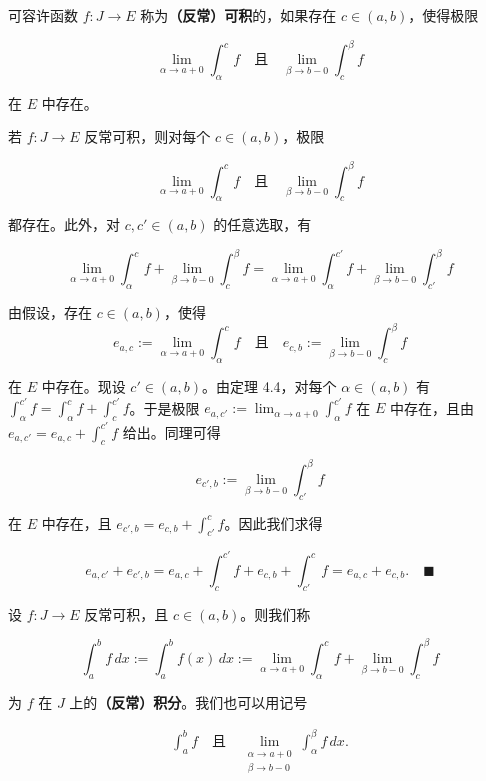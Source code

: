 可容许函数 $ f : J \to E $ 称为\textbf{（反常）可积}的，如果存在 $ c \in (a, b) $，使得极限

\[
\lim_{\alpha \to a+0} \int_{\alpha}^{c} f \quad \text{且} \quad \lim_{\beta \to b-0} \int_{c}^{\beta} f
\]

在 $ E $ 中存在。

\begin{lemma}

若 $ f : J \to E $ 反常可积，则对每个 $ c \in (a, b) $，极限

\[
\lim_{\alpha \to a+0} \int_{\alpha}^{c} f \quad \text{且} \quad \lim_{\beta \to b-0} \int_{c}^{\beta} f
\]

都存在。此外，对 $ c, c' \in (a, b) $ 的任意选取，有

\[
\lim_{\alpha \to a+0} \int_{\alpha}^{c} f + \lim_{\beta \to b-0} \int_{c}^{\beta} f = \lim_{\alpha \to a+0} \int_{\alpha}^{c'} f + \lim_{\beta \to b-0} \int_{c'}^{\beta} f
\]

\proofhead
由假设，存在 $ c \in (a, b) $，使得
\[
e_{a,c} := \lim_{\alpha \to a+0} \int_{\alpha}^{c} f \quad \text{且} \quad e_{c,b} := \lim_{\beta \to b-0} \int_{c}^{\beta} f
\]

在 $ E $ 中存在。现设 $ c' \in (a, b) $。由定理 4.4，对每个 $ \alpha \in (a, b) $ 有 $ \int_{\alpha}^{c'} f = \int_{\alpha}^{c} f + \int_{c}^{c'} f $。于是极限 $ e_{a,c'} := \lim_{\alpha \to a+0} \int_{\alpha}^{c'} f $ 在 $ E $ 中存在，且由 $ e_{a,c'} = e_{a,c} + \int_{c}^{c'} f $ 给出。同理可得

\[
e_{c',b} := \lim_{\beta \to b-0} \int_{c'}^{\beta} f
\]

在 $ E $ 中存在，且 $ e_{c',b} = e_{c,b} + \int_{c'}^{c} f $。因此我们求得

\[
e_{a,c'} + e_{c',b} = e_{a,c} + \int_{c}^{c'} f + e_{c,b} + \int_{c'}^{c} f = e_{a,c} + e_{c,b} .\quad\blacksquare
\]
\end{lemma}

设 $ f : J \to E $ 反常可积，且 $ c \in (a, b) $。则我们称

\[
\int_{a}^{b} f\,dx := \int_{a}^{b} f(x)\,dx := \lim_{\alpha \to a+0} \int_{\alpha}^{c} f + \lim_{\beta \to b-0} \int_{c}^{\beta} f
\]

为 $ f $ 在 $ J $ 上的\textbf{（反常）积分}。我们也可以用记号

\begin{equation*}
\begin{aligned}
\int_{a}^{b} f \quad \text{且} \quad \lim_{\substack{\alpha \to a+0 \\ \beta \to b-0}} \int_{\alpha}^{\beta} f\,dx .
\end{aligned}
\end{equation*}

